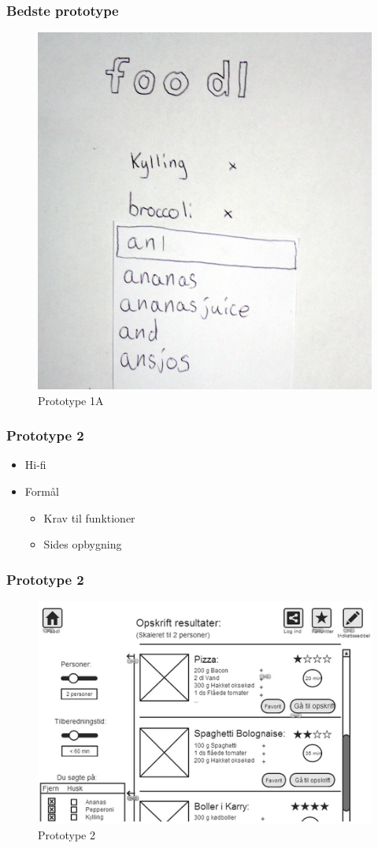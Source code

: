 \begin{frame} %
	\frametitle{Bedste prototype}
	\begin{figure}
	\centering
	\includegraphics[scale=0.08]{billeder/prototype1a.jpg}
	\caption{Prototype 1A}
	\end{figure}
\end{frame}

\begin{frame}
\frametitle{Prototype 2}
	\begin{itemize}
		\item Hi-fi
		\item Formål
		\begin{itemize}
		\item Krav til funktioner
		\item Sides opbygning
		\end{itemize}
	\end{itemize}
\end{frame}

\begin{frame}
	\frametitle{Prototype 2}
	\begin{figure}
	\centering
	\includegraphics[scale=0.6]{billeder/prototype2.png}
	\caption{Prototype 2}
	\end{figure}
\end{frame}




